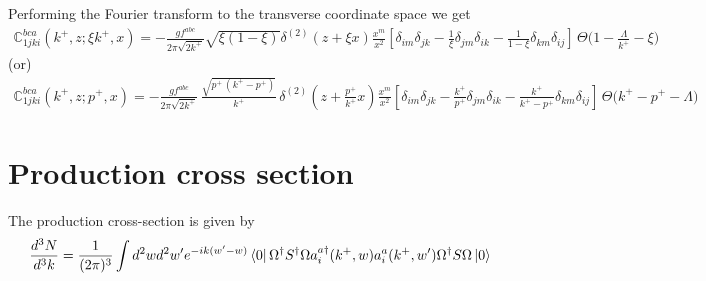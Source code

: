 \documentclass[aps,prd,amsmath,amssymb,nofootinbib]{revtex4-2}
\def\mf#1{\mathbb{#1}}
\numberwithin{equation}{section}
\begin{document}
Performing the Fourier transform to the transverse coordinate space we get
\begin{align}
   \mf{C}^{bca}_{1jki}(k^{+},z; \xi k^{+},x) = -\frac{gf^{abc}}{2\pi \sqrt{2k^{+}}}\sqrt{\xi(1-\xi)} \delta^{(2)}(z+\xi x)\frac{x^{m}}{x^{2}}\left[ \delta_{im} \delta_{jk}
     - \frac{1}{\xi}\delta_{jm} \delta_{ik}
   - \frac{1}{1-\xi} \delta_{km}\delta_{ij}
 \right]\,\Theta\bigg(1-\frac{\Lambda}{k^{+}}-\xi\bigg)
\end{align}
(or)
\begin{align}
   \mf{C}^{bca}_{1jki}(k^{+},z; p^{+},x) = -\frac{gf^{abc}}{2\pi \sqrt{2k^{+}}}\,\frac{\sqrt{p^{+}\,(k^{+}-p^{+})}}{k^{+}}\, \delta^{(2)}\left(z+\frac{p^{+}}{k^{+}} x\right)\frac{x^{m}}{x^{2}}\left[ \delta_{im} \delta_{jk}
     - \frac{k^{+}}{p^{+}}\delta_{jm} \delta_{ik}
   - \frac{k^{+}}{k^{+}-p^{+}} \delta_{km}\delta_{ij}
 \right]\,\Theta\bigg(k^{+}-p^{+}-\Lambda\bigg)
\end{align}


\section{Production cross section}

The production cross-section is given by 
\begin{equation}
\frac{d^3  N}{d^3 k} = \frac{1}{(2\pi)^{3}} \int d^{2}w d^{2} w^\prime 
e^{-ik (w^{\prime}-w)}
\bra{0}\Omega^{\dagger} S^{\dagger}\Omega a^{a\dagger}_{i}(k^{+},w) 
a^{a}_{i} (k^{+} , w^\prime) \Omega^{\dagger} S\Omega\ket{0}
\end{equation}
\end{document}
